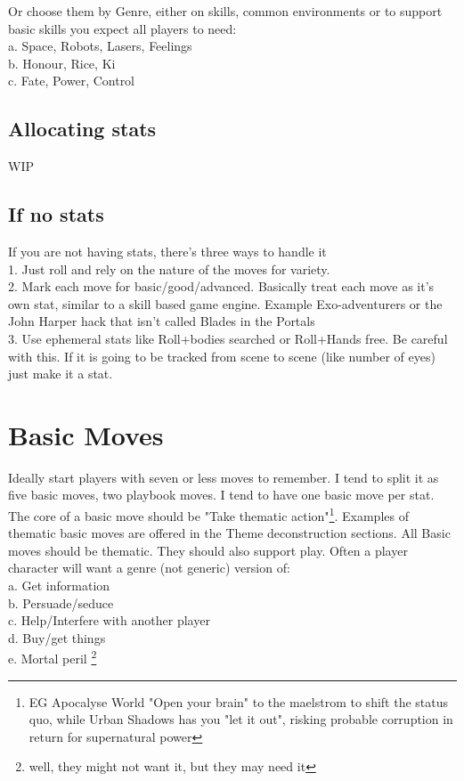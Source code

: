 \documentclass{tufte-handout}
\begin{document}
Or choose them by Genre, either on skills, common environments or to support basic skills you expect all players to need:\\ 
a. Space, Robots, Lasers,  Feelings\\
b. Honour, Rice, Ki\\
c. Fate, Power, Control \\

\subsection{Allocating stats}
WIP


\subsection{If no stats}
If you are not having stats, there's three ways to  handle it\\
1. Just roll and rely on the nature of the moves for variety.\\
2. Mark each move for basic/good/advanced. Basically treat each move as it's own stat, similar to a skill based game engine. Example  {Exo-adventurers or the John Harper hack that isn't called Blades in the Portals}\\
3. Use ephemeral stats like Roll+bodies searched or Roll+Hands free. Be careful with this. If it is going to be tracked from scene to scene (like number of eyes) just make it a stat.

\section{Basic Moves}
Ideally start players with seven or less moves to remember. I tend to split it as five basic moves, two playbook moves. I tend to have one basic move per stat. The core of a basic move should be "Take thematic action"\footnote{EG Apocalyse World "Open your brain" to the maelstrom to shift the status quo, while Urban Shadows has you "let it out", risking probable corruption in return for supernatural power}. Examples of thematic basic moves are offered in the Theme deconstruction sections.
All Basic moves should be thematic. They should also support play. Often a player character will want a genre (not generic) version of:\\
a. Get information\\
b. Persuade/seduce\\
c. Help/Interfere with another player\\
d. Buy/get things\\
e. Mortal peril \footnote{well, they might not want it, but they may need it}\\
\end{document}
